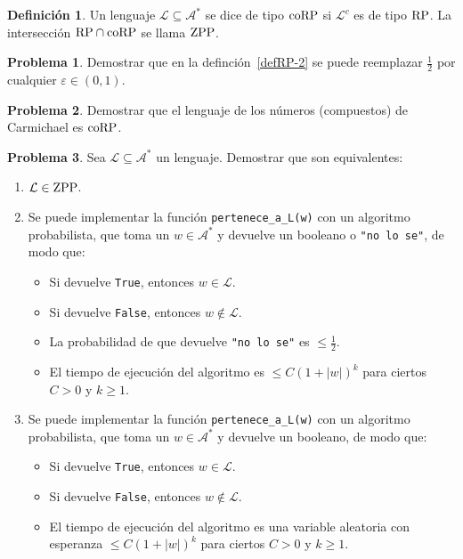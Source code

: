 \documentclass[a4paper, 11pt]{article}
\newcommand{\Alf}{\mathcal{A}}
\newcommand{\Lan}{\mathcal{L}}
\newcounter{numerodetema}
\theoremstyle{plain}
\theoremstyle{definition}
\newtheorem{defi}[teor]{Definición}
\newtheorem{prob}{Problema}[numerodetema]
\begin{document}
\begin{defi}
Un lenguaje $\Lan\subseteq\Alf^*$ se dice de tipo ${\rm coRP}$ si $\Lan^c$ es de
tipo ${\rm RP}$. La intersección ${\rm RP}\cap{\rm coRP}$ se llama ${\rm ZPP}$.
\end{defi}

\begin{prob}
Demostrar que en la definción~\ref{defRP-2} se puede reemplazar $\frac12$ por cualquier
$\varepsilon\in (0,1)$.
\end{prob}

\begin{prob}
Demostrar que el lenguaje de los números (compuestos) de Carmichael es ${\rm coRP}$.
\end{prob}

\begin{prob}\label{prob-vegas}
Sea $\Lan\subseteq\Alf^*$ un lenguaje. Demostrar que son equivalentes:
\begin{enumerate}
\item $\Lan\in{\rm ZPP}$.
\item Se puede implementar la función \texttt{pertenece\_a\_L(w)} con un algoritmo
probabilista, que toma un $w\in\Alf^*$ y devuelve un booleano o \texttt{"no lo se"},
de modo que:
\begin{itemize}
\item Si devuelve \texttt{True}, entonces $w\in\Lan$.
\item Si devuelve \texttt{False}, entonces $w\not\in\Lan$.
\item La probabilidad de que devuelve \texttt{"no lo se"} es $\leq \frac12$.
\item El tiempo de ejecución del algoritmo es $\leq C(1+|w|)^k$ para ciertos $C>0$
y $k\geq 1$.
\end{itemize}
\item Se puede implementar la función \texttt{pertenece\_a\_L(w)} con un algoritmo
probabilista, que toma un $w\in\Alf^*$ y devuelve un booleano, de modo que:
\begin{itemize}
\item Si devuelve \texttt{True}, entonces $w\in\Lan$.
\item Si devuelve \texttt{False}, entonces $w\not\in\Lan$.
\item El tiempo de ejecución del algoritmo es una variable aleatoria con esperanza
$\leq C(1+|w|)^k$ para ciertos $C>0$ y $k\geq 1$.
\end{itemize}
\end{enumerate}
\end{prob}
\end{document}
